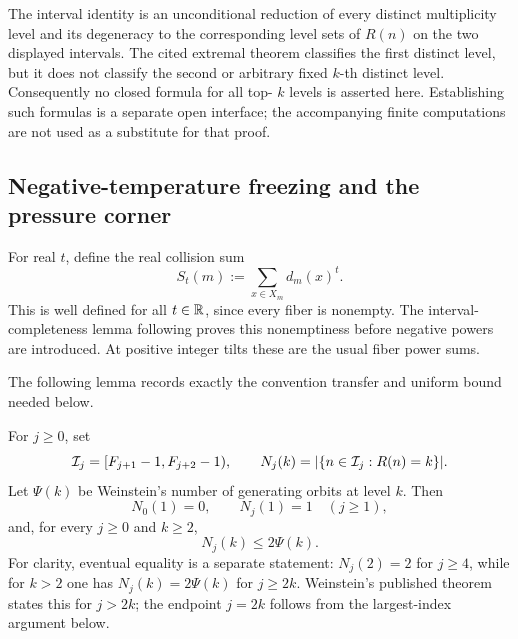 \begin{remark}
\label{rem:higher-extremal-ranks-open}
The interval identity is an unconditional reduction of every distinct
multiplicity level and its degeneracy to the corresponding level sets of
\(R(n)\) on the two displayed intervals.  The cited extremal theorem classifies
the first distinct level, but it does not classify the second or arbitrary
fixed \(k\)-th distinct level.  Consequently no closed formula for all top-
\(k\) levels is asserted here.  Establishing such formulas is a separate open
interface; the accompanying finite computations are not used as a substitute
for that proof.
\end{remark}

\subsection{Negative-temperature freezing and the pressure corner}

For real \(t\), define the real collision sum
\[
 S_t(m):=\sum_{x\in X_m}d_m(x)^t.
\]
This is well defined for all \(t\in\mathbb{R}\), since every fiber is nonempty.  The
interval-completeness lemma following  proves this
 nonemptiness before negative powers are introduced.  At positive integer
 tilts these are the usual fiber power sums.

The following lemma records exactly the convention transfer and uniform bound
needed below.

\begin{layercountlemma}
For \(j\ge0\), set
\[
 \mathcal I_j=[F_{j+1}-1,F_{j+2}-1),\qquad
 N_j(k)=\lvert \{n\in\mathcal I_j:R(n)=k\} \rvert.
\]
Let \(\Psi(k)\) be Weinstein's number of generating orbits at level \(k\).
Then
\[
 N_0(1)=0,\qquad N_j(1)=1\quad(j\ge1),
\]
and, for every \(j\ge0\) and \(k\ge2\),
\[
 N_j(k)\le 2\Psi(k).
\]
For clarity, eventual equality is a separate statement: \(N_j(2)=2\) for
\(j\ge4\), while for \(k>2\) one has
\(N_j(k)=2\Psi(k)\) for \(j\ge2k\).  Weinstein's published theorem states
this for \(j>2k\); the endpoint \(j=2k\) follows from the largest-index
argument below.
\end{layercountlemma}

